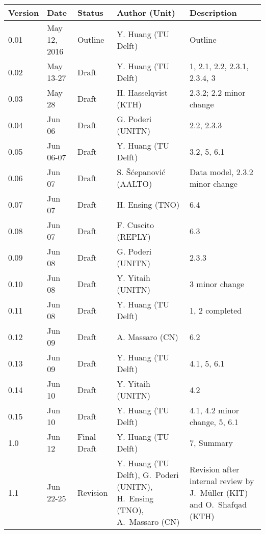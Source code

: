{\small
\begin{tabularx}{\textwidth}{|l|l|l|>{\raggedright\arraybackslash}p{4cm}|X|}
\hline
\textbf{Version}	& \textbf{Date} &	\textbf{Status} &	\textbf{Author (Unit)} &	\textbf{Description}  \\ \hline
0.01 & May 12, 2016 & Outline & Y. Huang (TU Delft) & Outline\\ \hline
0.02 & May 13-27 & Draft & Y. Huang (TU Delft) & 1, 2.1, 2.2, 2.3.1, 2.3.4, 3\\ \hline
0.03 & May 28 & Draft & H. Hasselqvist (KTH) &  2.3.2; 2.2 minor change\\ \hline
0.04 & Jun 06 & Draft &  G. Poderi (UNITN) & 2.2, 2.3.3 \\ \hline
0.05 & Jun 06-07 & Draft & Y. Huang (TU Delft) & 3.2, 5, 6.1 \\ \hline
0.06 & Jun 07 & Draft &  S. \v{S}\'{c}epanovi\'{c} (AALTO) & Data model, 2.3.2 minor change \\ \hline
0.07 & Jun 07 & Draft &  H. Ensing (TNO) & 6.4 \\ \hline
0.08 & Jun 07 & Draft &  F. Cuscito (REPLY) & 6.3 \\ \hline
0.09 & Jun 08 & Draft &  G. Poderi (UNITN) & 2.3.3 \\ \hline
0.10 & Jun 08 & Draft &  Y. Yitaih (UNITN) & 3 minor change \\ \hline
0.11 & Jun 08 & Draft & Y. Huang (TU Delft) & 1, 2 completed \\ \hline
0.12 & Jun 09 & Draft & A. Massaro  (CN) & 6.2 \\ \hline
0.13 & Jun 09 & Draft & Y. Huang (TU Delft) & 4.1, 5, 6.1 \\ \hline
0.14 & Jun 10 & Draft & Y. Yitaih (UNITN) & 4.2 \\ \hline
0.15 & Jun 10 & Draft & Y. Huang (TU Delft) & 4.1, 4.2 minor change, 5, 6.1 \\ \hline
1.0 & Jun 12 & Final Draft & Y. Huang (TU Delft) & 7, Summary \\ \hline
1.1 & Jun 22-25 & Revision & Y. Huang (TU Delft), G.~Poderi (UNITN),  H.~Ensing (TNO), A.~Massaro  (CN)  & Revision after internal review by  J.~M\"uller (KIT) and O.~Shafqad (KTH) \\ \hline
\end{tabularx}
}


